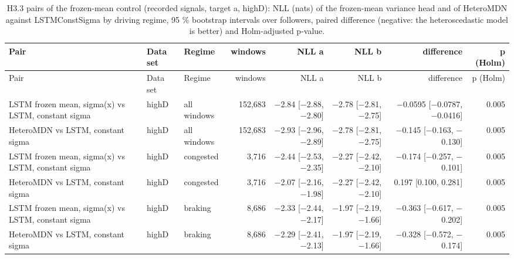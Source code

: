 \begingroup
\footnotesize
\begin{longtable}{lllrrrrr}
\caption{H3.3 pairs of the frozen-mean control (recorded signals, target a, highD): NLL (nats) of the frozen-mean variance head and of HeteroMDN against LSTMConstSigma by driving regime, 95 \% bootstrap intervals over followers, paired difference (negative: the heteroscedastic model is better) and Holm-adjusted p-value.}\label{tab:t3-h33-nll--ctrl--a--follower} \\
\toprule
Pair & Data set & Regime & windows & NLL a & NLL b & difference & p (Holm) \\
\midrule
\endfirsthead
\toprule
Pair & Data set & Regime & windows & NLL a & NLL b & difference & p (Holm) \\
\midrule
\endhead
\bottomrule
\endlastfoot
LSTM frozen mean, sigma(x) vs LSTM, constant sigma & highD & all windows & 152,683 & $-$2.84 [$-$2.88, $-$2.80] & $-$2.78 [$-$2.81, $-$2.75] & $-$0.0595 [$-$0.0787, $-$0.0416] & 0.005 \\
\midrule
HeteroMDN vs LSTM, constant sigma & highD & all windows & 152,683 & $-$2.93 [$-$2.96, $-$2.89] & $-$2.78 [$-$2.81, $-$2.75] & $-$0.145 [$-$0.163, $-$0.130] & 0.005 \\
\midrule
LSTM frozen mean, sigma(x) vs LSTM, constant sigma & highD & congested & 3,716 & $-$2.44 [$-$2.53, $-$2.35] & $-$2.27 [$-$2.42, $-$2.10] & $-$0.174 [$-$0.257, $-$0.101] & 0.005 \\
\midrule
HeteroMDN vs LSTM, constant sigma & highD & congested & 3,716 & $-$2.07 [$-$2.16, $-$1.98] & $-$2.27 [$-$2.42, $-$2.10] & 0.197 [0.100, 0.281] & 0.005 \\
\midrule
LSTM frozen mean, sigma(x) vs LSTM, constant sigma & highD & braking & 8,686 & $-$2.33 [$-$2.44, $-$2.17] & $-$1.97 [$-$2.19, $-$1.66] & $-$0.363 [$-$0.617, $-$0.202] & 0.005 \\
\midrule
HeteroMDN vs LSTM, constant sigma & highD & braking & 8,686 & $-$2.29 [$-$2.41, $-$2.13] & $-$1.97 [$-$2.19, $-$1.66] & $-$0.328 [$-$0.572, $-$0.174] & 0.005 \\

\end{longtable}
